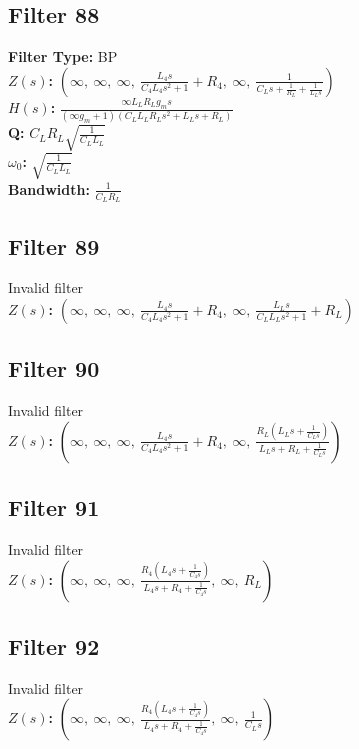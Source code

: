 \documentclass{article}
\begin{document}
\subsection*{Filter 88}
\textbf{Filter Type:} BP \\ 
\textbf{$Z(s)$:} $\left( \infty, \  \infty, \  \infty, \  \frac{L_{4} s}{C_{4} L_{4} s^{2} + 1} + R_{4}, \  \infty, \  \frac{1}{C_{L} s + \frac{1}{R_{L}} + \frac{1}{L_{L} s}}\right)$ \\ 
\textbf{$H(s)$:} $\frac{\infty L_{L} R_{L} g_{m} s}{\left(\infty g_{m} + 1\right) \left(C_{L} L_{L} R_{L} s^{2} + L_{L} s + R_{L}\right)}$ \\ 
\textbf{Q:} $C_{L} R_{L} \sqrt{\frac{1}{C_{L} L_{L}}}$ \\ 
\textbf{$\omega_0$:} $\sqrt{\frac{1}{C_{L} L_{L}}}$ \\ 
\textbf{Bandwidth:} $\frac{1}{C_{L} R_{L}}$ \\ 
\subsection*{Filter 89}
Invalid filter \\ 
\textbf{$Z(s)$:} $\left( \infty, \  \infty, \  \infty, \  \frac{L_{4} s}{C_{4} L_{4} s^{2} + 1} + R_{4}, \  \infty, \  \frac{L_{L} s}{C_{L} L_{L} s^{2} + 1} + R_{L}\right)$ \\ 
\subsection*{Filter 90}
Invalid filter \\ 
\textbf{$Z(s)$:} $\left( \infty, \  \infty, \  \infty, \  \frac{L_{4} s}{C_{4} L_{4} s^{2} + 1} + R_{4}, \  \infty, \  \frac{R_{L} \left(L_{L} s + \frac{1}{C_{L} s}\right)}{L_{L} s + R_{L} + \frac{1}{C_{L} s}}\right)$ \\ 
\subsection*{Filter 91}
Invalid filter \\ 
\textbf{$Z(s)$:} $\left( \infty, \  \infty, \  \infty, \  \frac{R_{4} \left(L_{4} s + \frac{1}{C_{4} s}\right)}{L_{4} s + R_{4} + \frac{1}{C_{4} s}}, \  \infty, \  R_{L}\right)$ \\ 
\subsection*{Filter 92}
Invalid filter \\ 
\textbf{$Z(s)$:} $\left( \infty, \  \infty, \  \infty, \  \frac{R_{4} \left(L_{4} s + \frac{1}{C_{4} s}\right)}{L_{4} s + R_{4} + \frac{1}{C_{4} s}}, \  \infty, \  \frac{1}{C_{L} s}\right)$ \\ 
\end{document}
